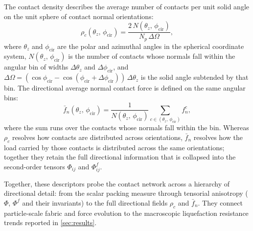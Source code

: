 The contact density \citep{Han2023} describes the average number of contacts per unit solid angle on the unit sphere of contact normal orientations:
\begin{equation}
\rho_c(\theta_z,\,\phi_{\mathrm{cir}}) = \frac{2\,N(\theta_z,\,\phi_{\mathrm{cir}})}{N_p\,\Delta\Omega},
\label{eq:contact_density}
\end{equation}
where $\theta_z$ and $\phi_{\mathrm{cir}}$ are the polar and azimuthal angles in the spherical coordinate system, $N(\theta_z,\,\phi_{\mathrm{cir}})$ is the number of contacts whose normals fall within the angular bin of widths $\Delta\theta_z$ and $\Delta\phi_{\mathrm{cir}}$, and $\Delta\Omega = (\cos\phi_{\mathrm{cir}} - \cos(\phi_{\mathrm{cir}}+\Delta\phi_{\mathrm{cir}}))\,\Delta\theta_z$ is the solid angle subtended by that bin. The directional average normal contact force is defined on the same angular bins:
\begin{equation}
\bar{f}_n(\theta_z,\,\phi_{\mathrm{cir}}) = \frac{1}{N(\theta_z,\,\phi_{\mathrm{cir}})} \sum_{c \in (\theta_z,\,\phi_{\mathrm{cir}})} f_n^c,
\label{eq:fn_directional}
\end{equation}
where the sum runs over the contacts whose normals fall within the bin. Whereas $\rho_c$ resolves how contacts are distributed across orientations, $\bar{f}_n$ resolves how the load carried by those contacts is distributed across the same orientations; together they retain the full directional information that is collapsed into the second-order tensors $\Phi_{ij}$ and $\Phi^f_{ij}$.

Together, these descriptors probe the contact network across a hierarchy of directional detail: from the scalar packing measure \Zm{} through tensorial anisotropy ($\Phi$, $\Phi^f$ and their invariants) to the full directional fields $\rho_c$ and $\bar{f}_n$. They connect particle-scale fabric and force evolution to the macroscopic liquefaction resistance trends reported in \cref{sec:results}.
